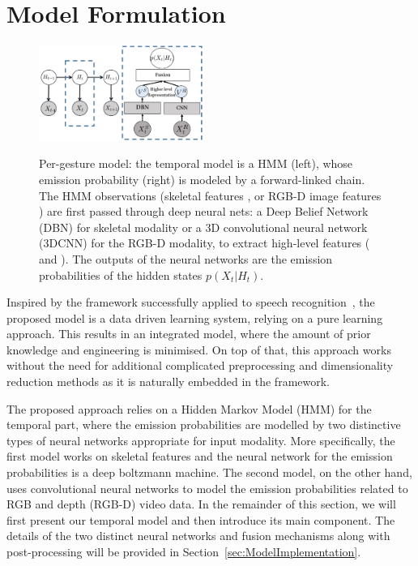 

\section{Model Formulation}
\label{sec:approach}

\begin{figure}[t]
  \centering
  \includegraphics[width=0.48\textwidth]{images/GraphicalModel_new2}\\
  \caption{Per-gesture model: the temporal model is a HMM (left), whose emission probability \emissionprob{} (right) is modeled by a forward-linked chain. The HMM observations \randomvariable{} (skeletal features \randomvariableSK{}, or RGB-D image features \randomvariableRGBD{}) are first passed through deep neural nets: a Deep Belief Network (DBN) for skeletal modality or a 3D convolutional neural network (3DCNN) for the RGB-D modality, to extract high-level features (\highSK{} and \highRGBD{}). The outputs of the neural networks are the emission probabilities of the hidden states $p(X_t | H_t )$.}\label{GM}
\end{figure}

Inspired by the framework successfully applied to speech recognition~\cite{mohamed2012acoustic}, the proposed model is a data driven learning system, relying on a pure learning approach. This results in an integrated model, where the amount of prior knowledge and engineering is minimised. On top of that, this approach works without the need for additional complicated preprocessing and dimensionality reduction methods as it is naturally embedded in the framework.

The proposed approach relies on a Hidden Markov Model (HMM) for the temporal part, where the emission probabilities are modelled by two distinctive types of neural networks appropriate for input modality.
 More specifically, the first model works on skeletal features and the neural network for the emission probabilities is a deep boltzmann machine. The second model, on the other hand, uses convolutional neural networks to model the emission probabilities related to RGB and depth (RGB-D) video data.
 In the remainder of this section, we will first present our temporal model and then introduce its main component. 
The details of the two distinct neural networks and fusion mechanisms along with post-processing will be provided 
in Section~\ref{sec:ModelImplementation}.


